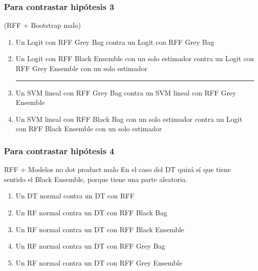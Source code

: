 \begin{note}
  \subsubsection*{Para contrastar hipótesis 3}
  (RFF + Bootstrap malo)
  \begin{enumerate}
    \item Un Logit con RFF Grey Bag contra un Logit con RFF Grey Bag
    \item Un Logit con RFF Black Ensemble con un solo estimador contra un Logit
          con RFF Grey Ensemble con un solo estimador
    \\\hrule
    \item Un SVM lineal con RFF Grey Bag contra un SVM lineal con RFF Grey Ensemble
    \item Un SVM lineal con RFF Black Bag con un solo estimador contra un Logit
          con RFF Black Ensemble con un solo estimador
  \end{enumerate}

  \subsubsection*{Para contrastar hipótesis 4}
  RFF + Modelos no dot product malo
  En el caso del DT quizá sí que tiene sentido el Black Ensemble, porque tiene
  una parte aleatoria.

  \begin{enumerate}

    \item Un DT normal contra un DT con RFF
    \item Un RF normal contra un DT con RFF Black Bag
    \item Un RF normal contra un DT con RFF Black Ensemble
    \item Un RF normal contra un DT con RFF Grey Bag
    \item Un RF normal contra un DT con RFF Grey Ensemble
  \end{enumerate}
\end{note}
